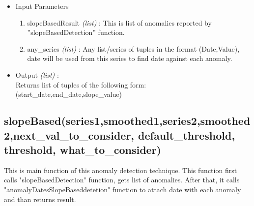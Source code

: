\begin{itemize}
 \item Input Parameters
 
 \begin{enumerate}
  \item slopeBasedResult \textit{(list)} : This is list of anomalies reported by ”slopeBasedDetection” function.
  \item any\_series \textit{(list)} : Any list/series of tuples in the format (Date,Value), date will be used from this series to find date against each anomaly.
 \end{enumerate}

 \item Output \textit{(list)} : \\
 	Returns list of tuples of the following form: \\ 
 	(start\_date,end\_date,slope\_value)

\end{itemize}


\subsection{slopeBased(series1,smoothed1,series2,smoothed2,next_val_to_consider, default_threshold, threshold, what_to_consider)}

This is main function of this anomaly detection technique. This function first calls "slopeBasedDetection" function, gets list of anomalies. 
After that, it calls "anomalyDatesSlopeBaseddetetion" function to attach date with each anomaly and than returns result.

